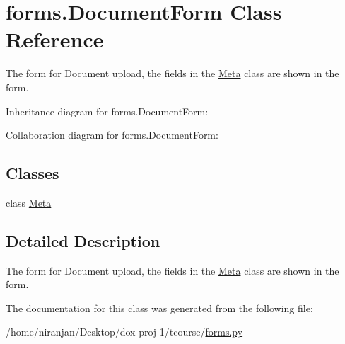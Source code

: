 \hypertarget{classforms_1_1_document_form}{}\section{forms.\+Document\+Form Class Reference}
\label{classforms_1_1_document_form}


The form for Document upload, the fields in the \hyperlink{classforms_1_1_document_form_1_1_meta}{Meta} class are shown in the form.  




Inheritance diagram for forms.\+Document\+Form\+:


Collaboration diagram for forms.\+Document\+Form\+:
\subsection*{Classes}
\begin{DoxyCompactItemize}
\item 
class \hyperlink{classforms_1_1_document_form_1_1_meta}{Meta}
\end{DoxyCompactItemize}


\subsection{Detailed Description}
The form for Document upload, the fields in the \hyperlink{classforms_1_1_document_form_1_1_meta}{Meta} class are shown in the form. 

The documentation for this class was generated from the following file\+:\begin{DoxyCompactItemize}
\item 
/home/niranjan/\+Desktop/dox-\/proj-\/1/tcourse/\hyperlink{forms_8py}{forms.\+py}\end{DoxyCompactItemize}

